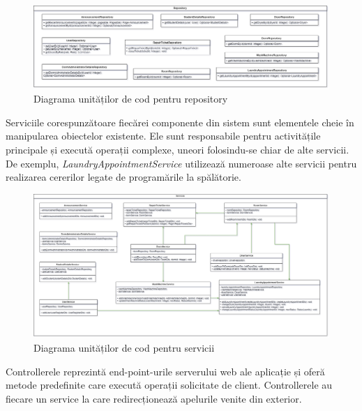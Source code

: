 \documentclass[12pt,a4paper]{report}
\theoremstyle{definition}
\theoremstyle{remark}
\begin{document}
\begin{figure}[H]
    \centering
    \includegraphics[width=1\linewidth]{resurse/diagrame/uvtdorms_d2.drawio.png}
    \caption{Diagrama unităților de cod pentru repository}
\end{figure}

\par Serviciile corespunzătoare fiecărei componente din sistem sunt elementele cheie în manipularea obiectelor existente. Ele sunt responsabile pentru activitățile principale și execută operații complexe, uneori folosindu-se chiar de alte servicii. De exemplu, \textit{LaundryAppointmentService} utilizează numeroase alte servicii pentru realizarea cererilor legate de programările la spălătorie.

\begin{figure}[H]
    \centering
    \includegraphics[width=1\linewidth]{resurse/diagrame/uvtdorms_d3.drawio.png}
    \caption{Diagrama unităților de cod pentru servicii}
\end{figure}

\par Controllerele reprezintă end-point-urile serverului web ale aplicație și oferă metode predefinite care execută operații solicitate de client. Controllerele au fiecare un service la care redirecționează apelurile venite din exterior.
\end{document}
